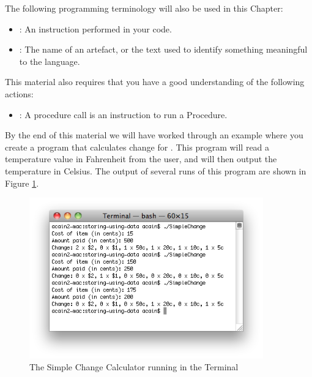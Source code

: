 The following programming terminology will also be used in this Chapter:
\begin{itemize}
  \item {}: An instruction performed in your code.
  \item {}: The name of an artefact, or the text used to identify something meaningful to the language.
\end{itemize}

This material also requires that you have a good understanding of the following actions:
\begin{itemize}
  \item {}: A procedure call is an instruction to run a Procedure.
\end{itemize}

\clearpage

By the end of this material we will have worked through an example where you create a program that calculates change for . This program will read a temperature value in Fahrenheit from the user, and will then output the temperature in Celsius. The output of several runs of this program are shown in Figure \ref{fig:storing-using-simeple-change}.

\begin{figure}[h]
   \centering
   \includegraphics[width=0.9\textwidth]{./topics/storing-using-data/images/SimpleChange} 
   \caption{The Simple Change Calculator running in the Terminal}
   \label{fig:storing-using-simeple-change}
\end{figure}















